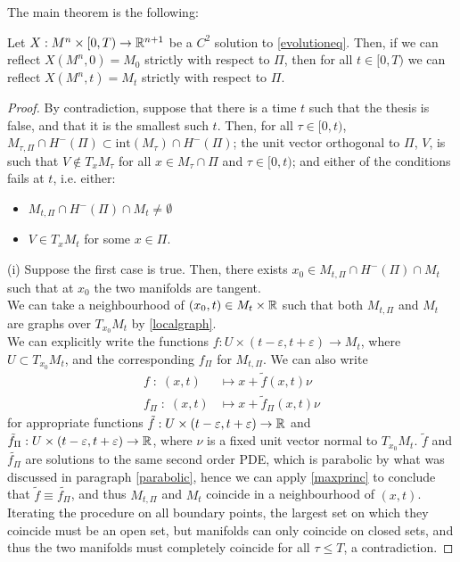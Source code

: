 The main theorem is the following: 

\begin{theorem}[Chow]
	Let $X:M^n\times [0,T) \rightarrow \mathbb{R}^{n+1}$ be a $C^2$ solution to \ref{evolutioneq}. Then, if we can reflect $X(M^n, 0)=M_0$ strictly with respect to $\Pi$, then for all $t\in [0,T)$ we can reflect $X(M^n, t)=M_t$ strictly with respect to $\Pi$. \label{reflection} 
\end{theorem}

\begin{proof}
	By contradiction, suppose that there is a time $t$ such that the thesis is false, and that it is the smallest such $t$. Then, for all $\tau \in [0,t)$, $M_{\tau,\Pi}\cap H^-(\Pi)\subset \mathrm{int}(M_{\tau})\cap H^-(\Pi)$; the unit vector orthogonal to $\Pi$, $V$, is such that $V\notin T_xM_\tau$ for all $x\in M_\tau\cap \Pi$ and $\tau \in [0,t)$; and either of the conditions fails at $t$, i.e. either: 
	\begin{itemize}
		\item[(i)] $M_{t,\Pi}\cap H^-(\Pi)\cap M_{t}\neq \emptyset$
		\item[(ii)] $V\in T_xM_t$  for some $x\in\Pi$. 
	\end{itemize} 

	(i) Suppose the first case is true. Then, there exists $x_0 \in M_{t,\Pi}\cap H^-(\Pi)\cap M_{t}$ such that at $x_0$ the two manifolds are tangent. \\
	We can take a neighbourhood of $(x_0, t)\in M_{t}\times \mathbb{R}$ such that  both $M_{t,\Pi}$ and $M_{t}$ are graphs over $T_{x_0}M_{t}$ by \ref{localgraph}. \\
	We can explicitly write the functions $f:U\times (t-\varepsilon, t+\varepsilon)\rightarrow M_t$, where $U\subset T_{x_0}M_{t}$, and the corresponding $f_\Pi$ for $M_{t,\Pi}$. 
	We can also write 
	\begin{align*}
		f \; : \; (x, t) &\mapsto x+\tilde{f}(x, t)\nu \\
		f_\Pi \; : \; (x, t) &\mapsto x+\tilde{f}_\Pi(x, t)\nu 
	\end{align*}
	for appropriate functions $\tilde{f}:U\times (t-\varepsilon, t+\varepsilon)\rightarrow \mathbb{R}$ and $\tilde{f}_\Pi:U\times (t-\varepsilon, t+\varepsilon)\rightarrow \mathbb{R}$, where $\nu$ is a fixed unit vector normal to $T_{x_0}M_{t}$.  $\tilde{f}$ and $\tilde{f_\Pi}$ are solutions to the same second order PDE, which is parabolic by what was discussed in paragraph \ref{parabolic}, hence we can apply \ref{maxprinc} to conclude that $\tilde{f}\equiv\tilde{f_\Pi}$, and thus $M_{t,\Pi}$ and $M_{t}$ coincide in a neighbourhood of $(x, t)$. \\ Iterating the procedure on all boundary points, the largest set on which they coincide must be an open set, but manifolds can only coincide on closed sets, and thus the two manifolds must completely coincide for all $\tau\leq T$, a contradiction.
	

\end{proof}
